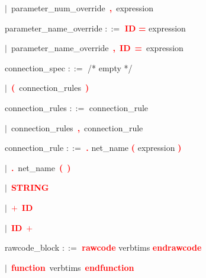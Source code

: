 \mbox{$|$ parameter\_num\_override \textbf{\textcolor{red}{,}} expression}

\vspace{1em}
\noindent
\settowidth{\parindent}{\hspace{4ex}}
parameter\_name\_override $::=$\hspace{1ex} \textbf{\textcolor{red}{ID}} \textbf{\textcolor{red}{=}} expression

\mbox{$|$ parameter\_name\_override \textbf{\textcolor{red}{,}} \textbf{\textcolor{red}{ID}} \textbf{\textcolor{red}{=}} expression}

\vspace{1em}
\noindent
\settowidth{\parindent}{\hspace{4ex}}
connection\_spec $::=$\hspace{1ex} /* empty */

\mbox{$|$ \textbf{\textcolor{red}{(}} connection\_rules \textbf{\textcolor{red}{)}}}

\vspace{1em}
\noindent
\settowidth{\parindent}{\hspace{4ex}}
connection\_rules $::=$\hspace{1ex} connection\_rule

\mbox{$|$ connection\_rules \textbf{\textcolor{red}{,}} connection\_rule}

\vspace{1em}
\noindent
\settowidth{\parindent}{\hspace{4ex}}
connection\_rule $::=$\hspace{1ex} \textbf{\textcolor{red}{.}} net\_name \textbf{\textcolor{red}{(}} expression \textbf{\textcolor{red}{)}}

\mbox{$|$ \textbf{\textcolor{red}{.}} net\_name \textbf{\textcolor{red}{(}} \textbf{\textcolor{red}{)}}}

\mbox{$|$ \textbf{\textcolor{red}{STRING}}}

\mbox{$|$ \textbf{\textcolor{red}{$+$}} \textbf{\textcolor{red}{ID}}}

\mbox{$|$ \textbf{\textcolor{red}{ID}} \textbf{\textcolor{red}{$+$}}}

\vspace{1em}
\noindent
\settowidth{\parindent}{\hspace{4ex}}
rawcode\_block $::=$\hspace{1ex} \textbf{\textcolor{red}{rawcode}} verbtims \textbf{\textcolor{red}{endrawcode}}

\mbox{$|$ \textbf{\textcolor{red}{function}} verbtims \textbf{\textcolor{red}{endfunction}}}

